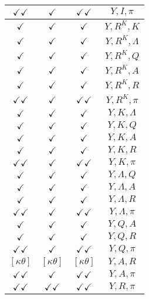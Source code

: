 \documentclass[a4paper,10pt]{article}
\begin{document}
\begin{longtable}{|c|c|c|c|}
\hline
$\checkmark\checkmark$ & $\checkmark$ & $\checkmark\checkmark$ & ${Y},{I},{\pi}$ \\
\hline
$\checkmark$ & $\checkmark$ & $\checkmark$ & ${Y},{R^{K}},{K}$ \\
\hline
$\checkmark$ & $\checkmark$ & $\checkmark$ & ${Y},{R^{K}},{\Lambda}$ \\
\hline
$\checkmark$ & $\checkmark$ & $\checkmark$ & ${Y},{R^{K}},{Q}$ \\
\hline
$\checkmark$ & $\checkmark$ & $\checkmark$ & ${Y},{R^{K}},{A}$ \\
\hline
$\checkmark$ & $\checkmark$ & $\checkmark$ & ${Y},{R^{K}},{R}$ \\
\hline
$\checkmark\checkmark$ & $\checkmark$ & $\checkmark\checkmark$ & ${Y},{R^{K}},{\pi}$ \\
\hline
$\checkmark$ & $\checkmark$ & $\checkmark$ & ${Y},{K},{\Lambda}$ \\
\hline
$\checkmark$ & $\checkmark$ & $\checkmark$ & ${Y},{K},{Q}$ \\
\hline
$\checkmark$ & $\checkmark$ & $\checkmark$ & ${Y},{K},{A}$ \\
\hline
$\checkmark$ & $\checkmark$ & $\checkmark$ & ${Y},{K},{R}$ \\
\hline
$\checkmark\checkmark$ & $\checkmark$ & $\checkmark\checkmark$ & ${Y},{K},{\pi}$ \\
\hline
$\checkmark$ & $\checkmark$ & $\checkmark$ & ${Y},{\Lambda},{Q}$ \\
\hline
$\checkmark$ & $\checkmark$ & $\checkmark$ & ${Y},{\Lambda},{A}$ \\
\hline
$\checkmark$ & $\checkmark$ & $\checkmark$ & ${Y},{\Lambda},{R}$ \\
\hline
$\checkmark\checkmark$ & $\checkmark$ & $\checkmark\checkmark$ & ${Y},{\Lambda},{\pi}$ \\
\hline
$\checkmark$ & $\checkmark$ & $\checkmark$ & ${Y},{Q},{A}$ \\
\hline
$\checkmark$ & $\checkmark$ & $\checkmark$ & ${Y},{Q},{R}$ \\
\hline
$\checkmark\checkmark$ & $\checkmark$ & $\checkmark\checkmark$ & ${Y},{Q},{\pi}$ \\
\hline
$[\kappa \theta ]$ & $[\kappa \theta ]$ & $[\kappa \theta ]$ & ${Y},{A},{R}$ \\
\hline
$\checkmark\checkmark$ & $\checkmark$ & $\checkmark\checkmark$ & ${Y},{A},{\pi}$ \\
\hline
$\checkmark\checkmark$ & $\checkmark\checkmark$ & $\checkmark\checkmark$ & ${Y},{R},{\pi}$ \\

\end{longtable}
\end{document}
